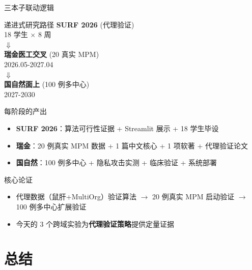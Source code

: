 \documentclass[aspectratio=169, 10pt]{beamer}
\begin{document}
\begin{frame}{三本子联动逻辑}
  \begin{block}{递进式研究路径}
    \centering
    \large
    \textcolor{myblue}{\textbf{SURF 2026}} (代理验证)\\[0.3em]
    \scriptsize 18 学生 $\times$ 8 周\\[0.8em]
    $\Downarrow$\\[0.5em]
    \textcolor{mygreen}{\textbf{瑞金医工交叉}} (20 真实 MPM)\\[0.3em]
    \scriptsize 2026.05-2027.04\\[0.8em]
    $\Downarrow$\\[0.5em]
    \textcolor{myorange}{\textbf{国自然面上}} (100 例多中心)\\[0.3em]
    \scriptsize 2027-2030
    \normalsize
  \end{block}
  \vspace{-0.3em}
  \begin{block}{每阶段的产出}
    \begin{itemize}
      \item \textbf{SURF 2026}：算法可行性证据 + Streamlit 展示 + 18 学生毕设
      \item \textbf{瑞金}：20 例真实 MPM 数据 + 1 篇中文核心 + 1 项软著 + 代理验证论文
      \item \textbf{国自然}：100 例多中心 + 隐私攻击实测 + 临床验证 + 系统部署
    \end{itemize}
  \end{block}
  \vspace{-0.3em}
  \begin{alertblock}{核心论证}
    \begin{itemize}
      \item 代理数据（鼠肝+MultiOrg）验证算法 $\to$ 20 例真实 MPM 启动验证 $\to$ 100 例多中心扩展验证
      \item 今天的 3 个跨域实验为\textbf{代理验证策略}提供定量证据
    \end{itemize}
  \end{alertblock}
\end{frame}

\section{总结}
\end{document}
